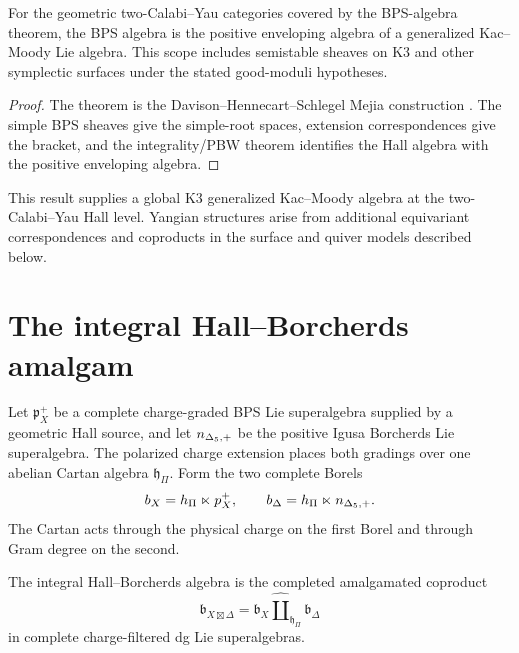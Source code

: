 \begin{theorem}
For the geometric two-Calabi--Yau categories covered by the BPS-algebra theorem, the BPS algebra is the positive enveloping algebra of a generalized Kac--Moody Lie algebra. This scope includes semistable sheaves on K3 and other symplectic surfaces under the stated good-moduli hypotheses.
\end{theorem}
\begin{proof}
The theorem is the Davison--Hennecart--Schlegel Mejia construction \cite{DHS}. The simple BPS sheaves give the simple-root spaces, extension correspondences give the bracket, and the integrality/PBW theorem identifies the Hall algebra with the positive enveloping algebra.
\end{proof}

This result supplies a global K3 generalized Kac--Moody algebra at the two-Calabi--Yau Hall level. Yangian structures arise from additional equivariant correspondences and coproducts in the surface and quiver models described below.

\chapter{The integral Hall--Borcherds amalgam}
Let $\mathfrak p_X^+$ be a complete charge-graded BPS Lie superalgebra supplied by a geometric Hall source, and let ${n_{\Delta_5,+}}$ be the positive Igusa Borcherds Lie superalgebra.  The polarized charge extension places both gradings over one abelian Cartan algebra $\mathfrak h_\Pi$.  Form the two complete Borels
\[
 b_X=h_\Pi\ltimes p_X^+,
 \qquad
 b_\Delta=h_\Pi\ltimes{n_{\Delta_5,+}}.
\]
The Cartan acts through the physical charge on the first Borel and through Gram degree on the second.

\begin{definition}
The integral Hall--Borcherds algebra is the completed amalgamated coproduct
\[
 \mathfrak b_{X\boxtimes\Delta}
 =\mathfrak b_X
  \widehat\amalg_{\mathfrak h_\Pi}
  \mathfrak b_\Delta
\]
in complete charge-filtered dg Lie superalgebras.
\end{definition}

